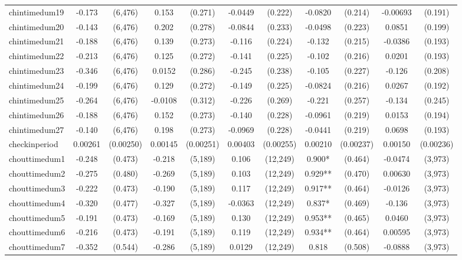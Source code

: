 \documentclass[]{article}
\begin{document}
\begin{tabular}{lcccccccccc}
chintimedum19 & -0.173 & (6,476) & 0.153 & (0.271) & -0.0449 & (0.222) & -0.0820 & (0.214) & -0.00693 & (0.191) \\
chintimedum20 & -0.143 & (6,476) & 0.202 & (0.278) & -0.0844 & (0.233) & -0.0498 & (0.223) & 0.0851 & (0.199) \\
chintimedum21 & -0.188 & (6,476) & 0.139 & (0.273) & -0.116 & (0.224) & -0.132 & (0.215) & -0.0386 & (0.193) \\
chintimedum22 & -0.213 & (6,476) & 0.125 & (0.272) & -0.141 & (0.225) & -0.102 & (0.216) & 0.0201 & (0.193) \\
chintimedum23 & -0.346 & (6,476) & 0.0152 & (0.286) & -0.245 & (0.238) & -0.105 & (0.227) & -0.126 & (0.208) \\
chintimedum24 & -0.199 & (6,476) & 0.129 & (0.272) & -0.149 & (0.225) & -0.0824 & (0.216) & 0.0267 & (0.192) \\
chintimedum25 & -0.264 & (6,476) & -0.0108 & (0.312) & -0.226 & (0.269) & -0.221 & (0.257) & -0.134 & (0.245) \\
chintimedum26 & -0.188 & (6,476) & 0.152 & (0.273) & -0.140 & (0.228) & -0.0961 & (0.219) & 0.0153 & (0.194) \\
chintimedum27 & -0.140 & (6,476) & 0.198 & (0.273) & -0.0969 & (0.228) & -0.0441 & (0.219) & 0.0698 & (0.193) \\
checkinperiod & 0.00261 & (0.00250) & 0.00145 & (0.00251) & 0.00403 & (0.00255) & 0.00210 & (0.00237) & 0.00150 & (0.00236) \\
chouttimedum1 & -0.248 & (0.473) & -0.218 & (5,189) & 0.106 & (12,249) & 0.900* & (0.464) & -0.0474 & (3,973) \\
chouttimedum2 & -0.275 & (0.480) & -0.269 & (5,189) & 0.103 & (12,249) & 0.929** & (0.470) & 0.00630 & (3,973) \\
chouttimedum3 & -0.222 & (0.473) & -0.190 & (5,189) & 0.117 & (12,249) & 0.917** & (0.464) & -0.0126 & (3,973) \\
chouttimedum4 & -0.320 & (0.477) & -0.327 & (5,189) & -0.0363 & (12,249) & 0.837* & (0.469) & -0.136 & (3,973) \\
chouttimedum5 & -0.191 & (0.473) & -0.169 & (5,189) & 0.130 & (12,249) & 0.953** & (0.465) & 0.0460 & (3,973) \\
chouttimedum6 & -0.216 & (0.473) & -0.191 & (5,189) & 0.119 & (12,249) & 0.934** & (0.464) & 0.00595 & (3,973) \\
chouttimedum7 & -0.352 & (0.544) & -0.286 & (5,189) & 0.0129 & (12,249) & 0.818 & (0.508) & -0.0888 & (3,973) \\

\end{tabular}
\end{document}
